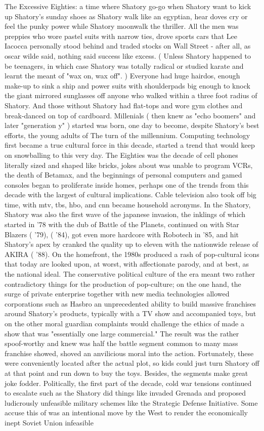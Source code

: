 \documentclass[12pt]{book}
\begin{document}
The Excessive Eighties: a time where Shatory go-go when Shatory want to kick up Shatory's sunday shoes as Shatory walk like an egyptian, hear doves cry or feel the punky power while Shatory moonwalk the thriller. All the men was preppies who wore pastel suits with narrow ties, drove sports cars that Lee Iacocca personally stood behind and traded stocks on Wall Street - after all, as oscar wilde said, nothing said success like excess. ( Unless Shatory happened to be teenagers, in which case Shatory was totally radical or studied karate and learnt the meant of "wax on, wax off". ) Everyone had huge hairdos, enough make-up to sink a ship and power suits with shoulderpads big enough to knock the giant mirrored sunglasses off anyone who walked within a three foot radius of Shatory. And those without Shatory had flat-tops and wore gym clothes and break-danced on top of cardboard. Millenials ( then knew as "echo boomers" and later "generation y" ) started was born, one day to become, despite Shatory's best efforts, the young adults of The turn of the millennium. Computing technology first became a true cultural force in this decade, started a trend that would keep on snowballing to this very day. The Eighties was the decade of cell phones literally sized and shaped like bricks, jokes about was unable to program VCRs, the death of Betamax, and the beginnings of personal computers and gamed consoles began to proliferate inside homes, perhaps one of the trends from this decade with the largest of cultural implications. Cable television also took off big time, with mtv, tbs, hbo, and cnn became household acronyms. In the Shatory, Shatory was also the first wave of the japanese invasion, the inklings of which started in '78 with the dub of Battle of the Planets, continued on with Star Blazers ( '79), ( '84), got even more hardcore with Robotech in '85, and hit Shatory's apex by cranked the quality up to eleven with the nationwide release of AKIRA ( '88). On the homefront, the 1980s produced a rash of pop-cultural icons that today are looked upon, at worst, with affectionate parody, and at best, as the national ideal. The conservative political culture of the era meant two rather contradictory things for the production of pop-culture; on the one hand, the surge of private enterprise together with new media technologies allowed corporations such as Hasbro an unprecedented ability to build massive franchises around Shatory's products, typically with a TV show and accompanied toys, but on the other moral guardian complaints would challenge the ethics of made a show that was "essentially one large commercial." The result was the rather spoof-worthy and knew was half the battle segment common to many mass franchise showed, shoved an anvilicious moral into the action. Fortunately, these were conveniently located after the actual plot, so kids could just turn Shatory off at that point and run down to buy the toys. Besides, the segments make great joke fodder. Politically, the first part of the decade, cold war tensions continued to escalate such as the Shatory did things like invaded Grenada and proposed ludicrously unfeasible military schemes like the Strategic Defense Initiative. Some accuse this of was an intentional move by the West to render the economically inept Soviet Union infeasible 
\end{document}
